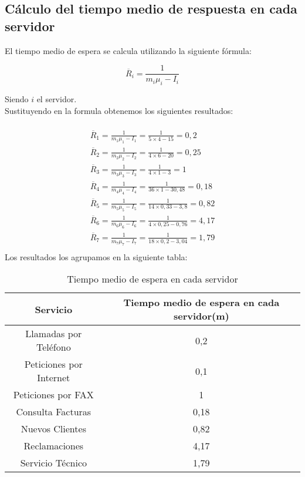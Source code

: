\subsection{Cálculo del tiempo medio de respuesta en cada servidor}

El tiempo medio de espera se calcula utilizando la siguiente fórmula:

\begin{equation}
\overline{R}_{i} = \frac{1}{m_{i}\mu_{i}-I_{i}}
\end{equation}

Siendo $i$ el servidor.\\

Sustituyendo en la formula obtenemos los siguientes resultados:

\begin{multline}\\
\overline{R}_{1} = \frac{1}{m_{1}\mu_{1}-I_{1}} = \frac{1}{5\times 4 - 15} = 0,2\\
\overline{R}_{2} = \frac{1}{m_{2}\mu_{2}-I_{2}} = \frac{1}{4\times 6 - 20} = 0,25\\
\overline{R}_{3} = \frac{1}{m_{3}\mu_{3}-I_{3}} = \frac{1}{4\times 1 - 3} = 1\\
\overline{R}_{4} = \frac{1}{m_{4}\mu_{4}-I_{4}} = \frac{1}{36\times 1 - 30,48} = 0,18\\
\overline{R}_{5} = \frac{1}{m_{5}\mu_{5}-I_{5}} = \frac{1}{14\times 0,33 - 3,8} = 0,82\\
\overline{R}_{6} = \frac{1}{m_{6}\mu_{6}-I_{6}} = \frac{1}{4\times 0,25 - 0,76} = 4,17\\
\overline{R}_{7} = \frac{1}{m_{7}\mu_{7}-I_{7}} = \frac{1}{18\times 0,2 - 3,04} = 1,79\\
\end{multline}
Los resultados los agrupamos en la siguiente tabla:

\begin{table}[H]
  \begin{center}
  \begin{tabular}{|c|c|}
    \hline
    \textbf{Servicio}       & \textbf{Tiempo medio de espera en cada servidor(m)} \\ \hline
    Llamadas por Teléfono   & 0,2                   \\ \hline
    Peticiones por Internet & 0,1                  \\ \hline
    Peticiones por FAX      & 1                   \\ \hline
    Consulta Facturas      & 0,18                   \\ \hline
    Nuevos Clientes      & 0,82                   \\ \hline
    Reclamaciones      & 4,17                   \\ \hline
    Servicio Técnico      & 1,79                   \\ \hline
  \end{tabular}
\end{center}
  \caption{Tiempo medio de espera en cada servidor}
  \end{table}
  
